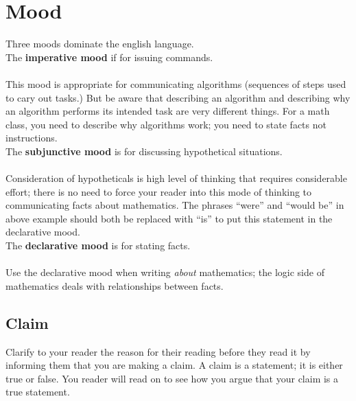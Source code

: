 \documentclass[12pt]{article}
\def\noi{\noindent}
\def\thup{\rightthumbsup}
\def\thdn{\rightthumbsdown}
\begin{document}
\section{ Mood}
Three moods dominate the english language. \\

\noi The {\bfseries imperative mood} if for issuing commands.\\[.2cm]
\thdn \\
This mood is appropriate for communicating  algorithms (sequences of steps used to cary out tasks.) But be aware that  describing an algorithm and describing why an algorithm performs its intended task are very different things. For a math class, you need to describe why algorithms work; you need to state facts not instructions.\\


\noi The {\bfseries subjunctive mood} is for discussing hypothetical situations.\\[.2cm]
\thdn \\[.2cm]
Consideration of hypotheticals  is high level of thinking that requires considerable effort; there is no need to force your reader into this mode of thinking to communicating facts about mathematics.  
The phrases ``were'' and ``would be'' in above example should both be replaced with ``is'' to put this statement in the declarative mood.\\

\noi The {\bfseries declarative mood} is for stating facts.\\[.2cm]
 \thup\\

Use the declarative mood when writing {\it about} mathematics; the logic side of mathematics deals with relationships between facts.





\subsection{Claim}
Clarify to your reader the reason for their reading before they read it by informing them that you are making a claim. %
A claim is a statement; it is either true or false. 
You reader will read on to see how you argue that your claim is a true statement. 
\end{document}
